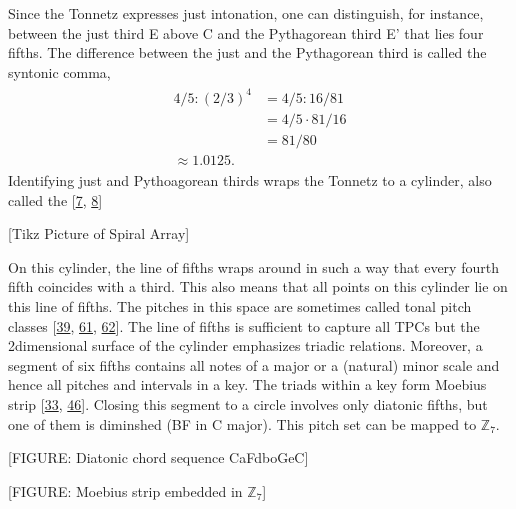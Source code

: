 \documentclass[letterpaper,10pt,english]{sphinxmanual}
\begin{document}
\sphinxAtStartPar
Since the Tonnetz expresses just intonation, one can distinguish, for
instance, between the just third E above C and the Pythagorean third E’
that lies four fifths. The difference between the just and the
Pythagorean third is called the syntonic comma,
\begin{equation*}
\begin{split}\begin{aligned}
    4/5 : (2/3)^4 &= 4/5 : 16/81\\
                                &= 4/5 \cdot 81/16\\
                                &= 81/80 \\
                                \approx 1.0125.\end{aligned}\end{split}
\end{equation*}
\sphinxAtStartPar
Identifying just and Pythoagorean thirds wraps the Tonnetz to a
cylinder, also called the 
{[}\hyperlink{cite.8_bibliography:id45}{7}, \hyperlink{cite.8_bibliography:id47}{8}{]}

\sphinxAtStartPar
{[}Tikz Picture of Spiral Array{]}

\sphinxAtStartPar
On this cylinder, the line of fifths wraps around in such a way that
every fourth fifth coincides with a third. This also means that all
points on this cylinder lie on this line of fifths. The pitches in this
space are sometimes called tonal pitch classes
{[}\hyperlink{cite.8_bibliography:id48}{39}, \hyperlink{cite.8_bibliography:id44}{61}, \hyperlink{cite.8_bibliography:id31}{62}{]}.
The line of
fifths is sufficient to capture all TPCs but the 2\sphinxhyphen{}dimensional surface
of the cylinder emphasizes triadic relations. Moreover, a segment of six
fifths contains all notes of a major or a (natural) minor scale and
hence all pitches and intervals in a key. The triads within a key form
Moebius strip {[}\hyperlink{cite.8_bibliography:id49}{33}, \hyperlink{cite.8_bibliography:id46}{46}{]}.
Closing this segment to a circle involves only diatonic fifths, but one of them is
diminshed (B\textendash{}F in C major). This pitch set can be mapped to
\(\mathbb Z_7\).

\sphinxAtStartPar
{[}FIGURE: Diatonic chord sequence C\sphinxhyphen{}a\sphinxhyphen{}F\sphinxhyphen{}d\sphinxhyphen{}bo\sphinxhyphen{}G\sphinxhyphen{}e\sphinxhyphen{}C{]}

\sphinxAtStartPar
{[}FIGURE: Moebius strip embedded in \(\mathbb Z_7\){]}
\end{document}
